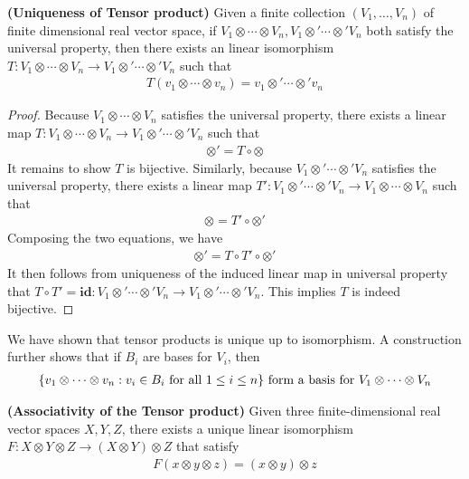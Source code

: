 \documentclass{report}
\begin{document}
\begin{theorem}
\label{UoT}
\textbf{(Uniqueness of Tensor product)} Given a finite collection $(V_1,\dots, V_n)$ of finite dimensional real vector space, if $V_1 \otimes \cdots \otimes  V_n ,V_1\otimes  '\cdots \otimes  ' V_n$ both satisfy the universal property, then there exists an linear isomorphism $T:V_1 \otimes  \cdots \otimes  V_n \rightarrow V_1 \otimes' \cdots \otimes  ' V_n $ such that 
\begin{align*}
T(v_1\otimes  \cdots \otimes  v_n)=v_1 \otimes  '\cdots \otimes  'v_n
\end{align*}
\end{theorem}
\begin{proof}
Because $V_1 \otimes  \cdots \otimes  V_n$ satisfies the universal property, there exists a linear map $T:V_1 \otimes  \cdots \otimes  V_n\rightarrow V_1 \otimes'  \cdots \otimes' V_n  $ such that  
\begin{align*}
\otimes' =T \circ \otimes  
\end{align*}
It remains to show $T$ is bijective. Similarly, because $V_1 \otimes ' \cdots \otimes'  V_n$ satisfies the universal property, there exists a linear map $T':V_1 \otimes'  \cdots \otimes'  V_n\rightarrow V_1 \otimes  \cdots \otimes V_n  $ such that 
\begin{align*}
\otimes = T' \circ \otimes  '
\end{align*}
Composing the two equations, we have 
\begin{align*}
\otimes '=T\circ T' \circ \otimes  '
\end{align*}
It then follows from uniqueness of the induced linear map in universal property that $T \circ T'=\textbf{id}:V_1 \otimes  ' \cdots \otimes  'V_n \rightarrow V_1 \otimes  ' \cdots \otimes  'V_n$. This implies $T$ is indeed bijective. 
\end{proof}
\begin{mdframed}
We have shown that tensor products is unique up to isomorphism. A construction further shows that if $B_i$ are bases for $V_i$, then 
 \begin{align*}
\{ v_1 \otimes  \cdots \otimes v_n: v_i \in B_i\text{ for all }1\leq i\leq n   \}\text{ form a basis for }V_1 \otimes  \cdots \otimes  V_n
\end{align*}
\end{mdframed}
\begin{theorem}
\textbf{(Associativity of the Tensor product)} Given three finite-dimensional real vector spaces $X,Y,Z$,  there exists a unique linear isomorphism $F:X\otimes  Y\otimes  Z\rightarrow (X\otimes  Y)\otimes  Z$ that satisfy 
\begin{align*}
F(x\otimes  y \otimes  z)=(x\otimes  y)\otimes  z
\end{align*}
\end{theorem}
\end{document}
